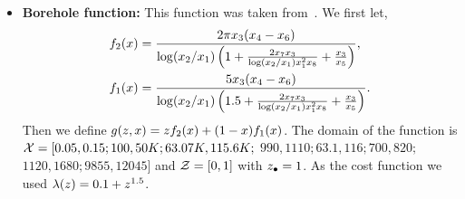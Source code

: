 \begin{itemize}[leftmargin=0.0in]
For the $3$ dimensional case we used $\cost(z) = 0.05 + (1 - 0.05)z_1^3z_2^2$ and,
\[
A = 
\begin{bmatrix}
3 & 10 & 30 \\
0.1 & 10 & 35 \\
3 & 10 & 30 \\
0.1 & 10 & 35 
\end{bmatrix},
\quad
P = 10^{-4} \times
\begin{bmatrix}
3689 & 1170 & 2673 \\
4699 & 4387 & 7470 \\
1091 & 8732 & 5547 \\
381 & 5743 & 8828
\end{bmatrix}.
\]
For the $3$ dimensional case we used $\cost(z) = 0.05 + (1 -
0.05)z_1^3z_2^2z_3^{1.5}z_4^{1}$ and,
\[
A = 
\begin{bmatrix}
10 & 3 & 17 & 3.5 & 1.7 & 8 \\
0.05 & 10 & 17 & 0.1 & 8 & 14 \\
3 & 3.5 & 1.7 & 10 & 17 & 8 \\
17 & 8 & 0.05 & 10 & 0.1 & 14 
\end{bmatrix},
\;\;
P = 10^{-4} \times
\begin{bmatrix}
1312 & 1696 & 5569 &  124 & 8283 & 5886 \\
2329 & 4135 & 8307 & 3736 & 1004 & 9991 \\
2348 & 1451 & 3522 & 2883 & 3047 & 6650 \\
4047 & 8828 & 8732 & 5743 & 1091 &  381 \\
\end{bmatrix}.
\]




\item[]
\textbf{Borehole function:}
This function was taken from~\citep{xiong13highAccuracy}.
We first let,
\begin{align*}
f_2(x) &= \frac{2\pi x_3(x_4-x_6)}
  {\log(x_2/x_1) \left(1 + \frac{2x_7x_3}{\log(x_2/x_1)x_1^2x_8} +
    \frac{x_3}{x_5} \right)}, \\
f_1(x) &= \frac{5 x_3(x_4-x_6)}
  {\log(x_2/x_1) \left(1.5 + \frac{2x_7x_3}{\log(x_2/x_1)x_1^2x_8} +
    \frac{x_3}{x_5} \right)}. 
\end{align*}
Then we define $g(z,x) = zf_2(x) + (1-x)f_1(x)$.
The domain of the function is $\mathcal{X} = [0.05, 0.15; 100, 50K; 63.07K, 115.6K;$
$990, 1110; 63.1, 116; 700, 820;$ $1120, 1680; 9855, 12045]$
and $\mathcal{Z}=[0,1]$ with $z_{\bullet} = 1$.
As the cost function we used $\lambda(z) = 0.1 + z^{1.5}$.


\end{itemize}
